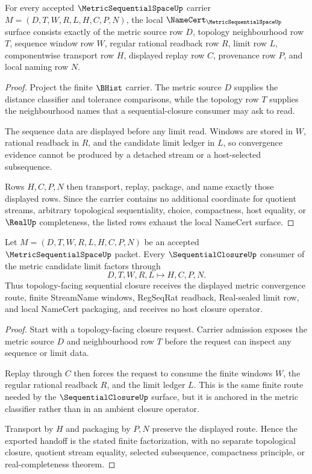 \begin{theorem}
\label{thm:metric-sequential-space-namecert-obligations}
For every accepted $\MetricSequentialSpaceUp$ carrier $M=(D,T,W,R,L,H,C,P,N)$, the local $\NameCert_{\MetricSequentialSpaceUp}$ surface consists exactly of the metric source row $D$, topology neighbourhood row $T$, sequence window row $W$, regular rational readback row $R$, limit row $L$, componentwise transport row $H$, displayed replay row $C$, provenance row $P$, and local naming row $N$.
\end{theorem}
\begin{proof}
Project the finite $\BHist$ carrier. The metric source $D$ supplies the distance classifier and tolerance comparisons, while the topology row $T$ supplies the neighbourhood names that a sequential-closure consumer may ask to read.

The sequence data are displayed before any limit read. Windows are stored in $W$, rational readback in $R$, and the candidate limit ledger in $L$, so convergence evidence cannot be produced by a detached stream or a host-selected subsequence.

Rows $H,C,P,N$ then transport, replay, package, and name exactly those displayed rows. Since the carrier contains no additional coordinate for quotient streams, arbitrary topological sequentiality, choice, compactness, host equality, or $\RealUp$ completeness, the listed rows exhaust the local NameCert surface.
\end{proof}

\begin{theorem}
\label{thm:metric-sequential-space-sequential-closure-handoff}
Let $M=(D,T,W,R,L,H,C,P,N)$ be an accepted $\MetricSequentialSpaceUp$ packet. Every $\SequentialClosureUp$ consumer of the metric candidate limit factors through
$$
D,T,W,R,L \longmapsto H,C,P,N .
$$
Thus topology-facing sequential closure receives the displayed metric convergence route, finite StreamName windows, RegSeqRat readback, Real-sealed limit row, and local NameCert packaging, and receives no host closure operator.
\end{theorem}
\begin{proof}
Start with a topology-facing closure request. Carrier admission exposes the metric source $D$ and neighbourhood row $T$ before the request can inspect any sequence or limit data.

Replay through $C$ then forces the request to consume the finite windows $W$, the regular rational readback $R$, and the limit ledger $L$. This is the same finite route needed by the $\SequentialClosureUp$ surface, but it is anchored in the metric classifier rather than in an ambient closure operator.

Transport by $H$ and packaging by $P,N$ preserve the displayed route. Hence the exported handoff is the stated finite factorization, with no separate topological closure, quotient stream equality, selected subsequence, compactness principle, or real-completeness theorem.
\end{proof}

